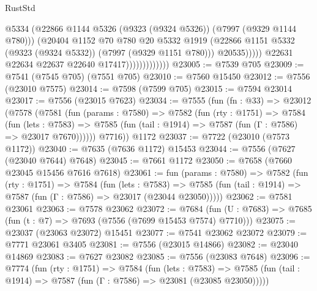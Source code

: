 \begin{lexlean}{RustStd}
\begin{coremodule}
{\begin{coremodule}
{{{{{{{{{{{{{{{{{{{{{{{{{{{{{{{{{{{{{{{{{{{                                      @5334
                                      (@22866
                                        @1144
                                        @5326
                                        (@9323 (@9324 @5326))
                                        (@7997 (@9329 @1144 @780)))
                                      (@20404
                                        @1152
                                        @70
                                        @780
                                        @20
                                        @5332
                                        @1919
                                        (@22866
                                          @1151
                                          @5332
                                          (@9323 (@9324 @5332))
                                          (@7997 (@9329 @1151 @780)))
                                        @20535)))))
                              @22631
                              @22634
                              @22637
                              @22640
                              @17417)))))))))))))
@23005 := @7539 @705
@23009 := @7541 (@7545 @705) (@7551 @705)
@23010 := @7560 @15450
@23012 := @7556 (@23010 @7575)
@23014 := @7598 (@7599 @705)
@23015 := @7594 @23014
@23017 := @7556 (@23015 @7623)
@23034 := @7555
    (fun (fn : @33) =>
    @23012
      (@7578
        (@7581
          (fun (params : @7580) =>
          @7582
            (fun (rty : @1751) =>
            @7584
              (fun (lets : @7583) =>
              @7585 (fun (tail : @1914) => @7587 (fun (Γ : @7586) => @23017 @7670))))))
        @7716))
    @1172
@23037 := @7722 (@23010 (@7573 @1172))
@23040 := @7635 (@7636 @1172) @15453
@23044 := @7556 (@7627 (@23040 @7644) @7648)
@23045 := @7661 @1172
@23050 := @7658 (@7660 @23045 @15456 @7616 @7618)
@23061 := fun (params : @7580) =>
  @7582
    (fun (rty : @1751) =>
    @7584
      (fun (lets : @7583) =>
      @7585 (fun (tail : @1914) => @7587 (fun (Γ : @7586) => @23017 (@23044 @23050)))))
@23062 := @7581 @23061
@23063 := @7578 @23062
@23072 := @7684
    (fun (U : @7683) => @7685 (fun (t : @7) => @7693 (@7556 (@7699 @15453 @7574) @7710)))
@23075 := @23037 (@23063 @23072) @15451
@23077 := @7541 @23062 @23072
@23079 := @7771 @23061 @3405
@23081 := @7556 (@23015 @14866)
@23082 := @23040 @14869
@23083 := @7627 @23082
@23085 := @7556 (@23083 @7648)
@23096 := @7774
    (fun (rty : @1751) =>
    @7584
      (fun (lets : @7583) =>
      @7585 (fun (tail : @1914) => @7587 (fun (Γ : @7586) => @23081 (@23085 @23050)))))
}}}}}}}}}}}}}}}}}}}}}}}}}}}}}}}}}}}}}}}}}}}
\end{coremodule}}
\end{coremodule}
\end{lexlean}
